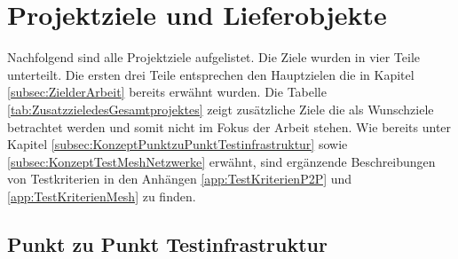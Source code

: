 \clearpage
\section{Projektziele und Lieferobjekte}\label{sec:ProjektzieleundLieferobjekte}

Nachfolgend sind alle Projektziele aufgelistet. Die Ziele wurden in vier Teile unterteilt. Die ersten drei Teile entsprechen den Hauptzielen die in Kapitel \ref{subsec:ZielderArbeit} bereits erwähnt wurden. Die Tabelle \ref{tab:ZusatzzieledesGesamtprojektes} zeigt zusätzliche Ziele die als Wunschziele betrachtet werden und somit nicht im Fokus der Arbeit stehen. Wie bereits unter Kapitel \ref{subsec:KonzeptPunktzuPunktTestinfrastruktur} sowie \ref{subsec:KonzeptTestMeshNetzwerke} erwähnt, sind ergänzende Beschreibungen von Testkriterien in den Anhängen \ref{app:TestKriterienP2P} und \ref{app:TestKriterienMesh} zu finden.

\subsection{Punkt zu Punkt Testinfrastruktur}\label{subsec:PunktzuPunktTestinfrastruktur}

